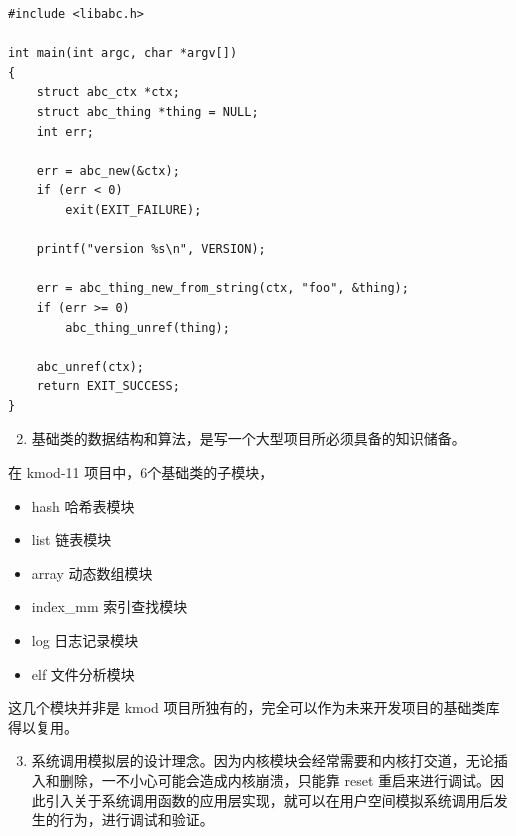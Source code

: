 \documentclass[11pt,a4paper]{article}
\begin{document}
{\begin{shaded}\begin{verbatim}
#include <libabc.h>

int main(int argc, char *argv[])
{
    struct abc_ctx *ctx;
    struct abc_thing *thing = NULL;
    int err;

    err = abc_new(&ctx);
    if (err < 0)
        exit(EXIT_FAILURE);

    printf("version %s\n", VERSION);

    err = abc_thing_new_from_string(ctx, "foo", &thing);
    if (err >= 0)
        abc_thing_unref(thing);

    abc_unref(ctx);
    return EXIT_SUCCESS;
}
\end{verbatim}\end{shaded}}
\begin{enumerate}[1)]
\setcounter{enumi}{1}
\item
  基础类的数据结构和算法，是写一个大型项目所必须具备的知识储备。
\end{enumerate}
在 kmod-11 项目中，6个基础类的子模块，

\begin{itemize}
\item
  hash 哈希表模块
\item
  list 链表模块
\item
  array 动态数组模块
\item
  index\_mm 索引查找模块
\item
  log 日志记录模块
\item
  elf 文件分析模块
\end{itemize}
这几个模块并非是 kmod
项目所独有的，完全可以作为未来开发项目的基础类库得以复用。

\begin{enumerate}[1)]
\setcounter{enumi}{2}
\item
  系统调用模拟层的设计理念。因为内核模块会经常需要和内核打交道，无论插入和删除，一不小心可能会造成内核崩溃，只能靠
  reset
  重启来进行调试。因此引入关于系统调用函数的应用层实现，就可以在用户空间模拟系统调用后发生的行为，进行调试和验证。
\end{enumerate}
\end{document}
